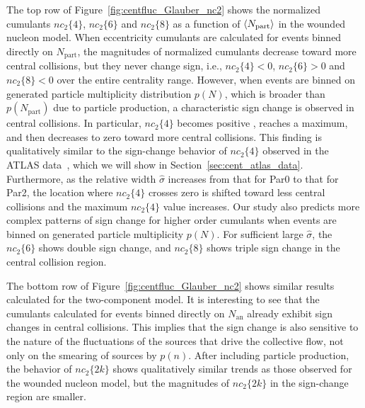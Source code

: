 The top row of Figure~\ref{fig:centfluc_Glauber_nc2} shows the normalized cumulants $nc_2\{4\}$, $nc_2\{6\}$ and $nc_2\{8\}$ as a function of $\left\langle N_\text{part}\right\rangle$ in the wounded nucleon model. When eccentricity cumulants are calculated for events binned directly on $N_\text{part}$, the magnitudes of normalized cumulants decrease toward more central collisions, but they never change sign, i.e., $nc_2\{4\}<0$, $nc_2\{6\}>0$ and $nc_2\{8\}<0$ over the entire centrality range. However, when events are binned on generated particle multiplicity distribution $p(N)$, which is broader than $p(N_\text{part})$ due to particle production, a characteristic sign change is observed in central collisions. In particular, $nc_2\{4\}$ becomes positive , reaches a maximum, and then decreases to zero toward more central collisions. This finding is qualitatively similar to the sign-change behavior of $nc_2\{4\}$ observed in the ATLAS data~\cite{ATLAS-CONF-2017-066}, which we will show in Section~\ref{sec:cent_atlas_data}. Furthermore, as the relative width $\hat{\sigma}$ increases from that for Par0 to that for Par2, the location where $nc_2\{4\}$ crosses zero is shifted toward less central collisions and the maximum $nc_2\{4\}$ value increases. Our study also predicts more complex patterns of sign change for higher order cumulants when events are binned on generated particle multiplicity $p(N)$. For sufficient large $\hat{\sigma}$, the $nc_2\{6\}$ shows double sign change, and $nc_2\{8\}$ shows triple sign change in the central collision region.

The bottom row of Figure~\ref{fig:centfluc_Glauber_nc2} shows similar results calculated for the two-component model. It is interesting to see that the cumulants calculated for events binned directly on $N_\text{an}$ already exhibit sign changes in central collisions. This implies that the sign change is also sensitive to the nature of the fluctuations of the sources that drive the collective flow, not only on the smearing of sources by $p(n)$. After including particle production, the behavior of $nc_2\{2k\}$ shows qualitatively similar trends as those observed for the wounded nucleon model, but the magnitudes of $nc_2\{2k\}$ in the sign-change region are smaller.

